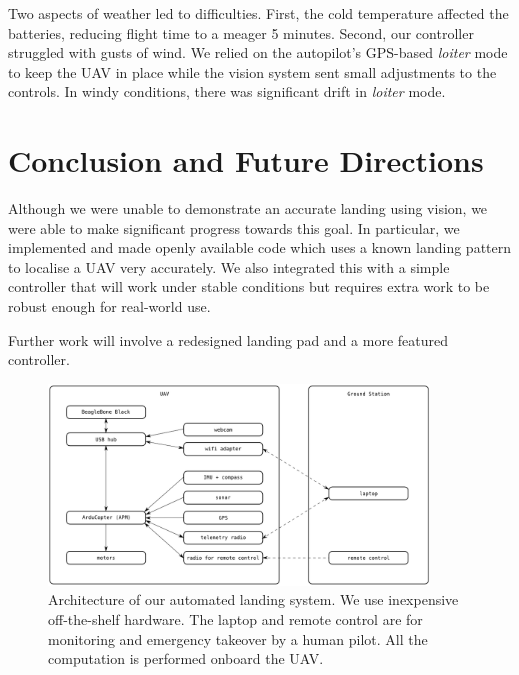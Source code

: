 \documentclass[10pt]{scrartcl} %
\begin{document}
Two aspects of weather led to difficulties. First, the cold temperature
affected the batteries, reducing flight time to a meager 5 minutes.  Second,
our controller struggled with gusts of wind. We relied on the autopilot's
GPS-based \textit{loiter} mode to keep the UAV in place while the vision system
sent small adjustments to the controls. In windy conditions, there was
significant drift in \textit{loiter} mode.


\section{Conclusion and Future Directions}

Although we were unable to demonstrate an accurate landing using vision, we
were able to make significant progress towards this goal. In particular, we
implemented and made openly available code which uses a known landing pattern
to localise a UAV very accurately. We also integrated this with a simple
controller that will work under stable conditions but requires extra work to be
robust enough for real-world use.

Further work will involve a redesigned landing pad and a more featured controller.


\printbibliography


\clearpage

\begin{figure}[h!]
\centering
\includegraphics[width=0.9\textwidth]{images/architecture.png}
\caption{
    Architecture of our automated landing system. We use inexpensive
    off-the-shelf hardware. The laptop and remote control are for
    monitoring and emergency takeover by a human pilot. All the
    computation is performed onboard the UAV.
}
\label{fig:hardware-arch}
\end{figure}
\end{document}
